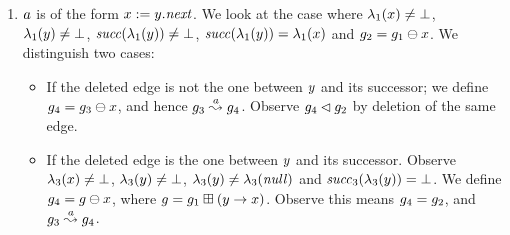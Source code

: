 \begin{enumerate}
\begin{enumerate}
\item $a$ is of the form $x:=y.{\it next}$.
%
%
  We look at the case  where 
  $\lambda_1(x)\neq\bot$, %
  $\lambda_1(y)\neq\bot$, %
  ${\it succ}(\lambda_1(y))\neq\bot$, %
  ${\it succ}(\lambda_1(y))=\lambda_1(x)$ and
  $g_2=g_1\ominus{\ensuremath{x}}$.
%
  We distinguish two cases:
  \begin{itemize}
  \item If the deleted edge is not the 
    one between $y$ and its successor;
    we define $g_4=g_3\ominus{\ensuremath{x}}$, and hence 
    $g_3\stackrel{a}{\leadsto}g_4$.
    Observe $g_4\lhd g_2$ by deletion of the same edge.
  \item If the deleted edge is the one between $y$ and its successor.
    Observe $\lambda_3(x)\neq\bot$, %
    $\lambda_3(y)\neq\bot$, %
    $\lambda_3(y)\neq\lambda_3({\it null})$ and 
    ${\it succ}_3(\lambda_3(y))=\bot$. 
    We define $g_4=g\ominus{\ensuremath{x}}$, where
    $g=g_1\boxplus({y}\rightarrow{\ensuremath{x}})$.
    Observe this means $g_4=g_2$, and 
    $g_3\stackrel{a}{\leadsto}g_4$.
  \end{itemize}

\end{enumerate}
\end{enumerate}
